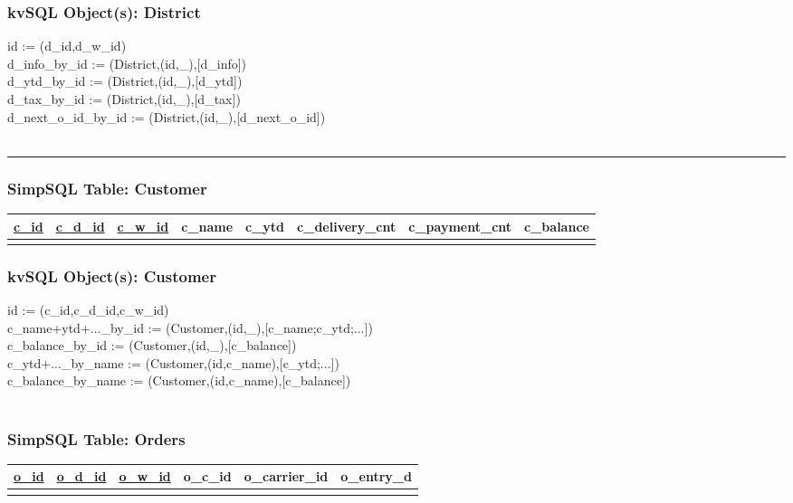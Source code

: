 \documentclass[12pt,letter]{article}
\begin{document}
\subsubsection*{kvSQL Object(s): District}  
 id := (d\_id,d\_w\_id) \\
 d\_info\_by\_id := 
(District,(id,\_),[d\_info])  \\
 d\_ytd\_by\_id := 
(District,(id,\_),[d\_ytd])  \\
 d\_tax\_by\_id := 
(District,(id,\_),[d\_tax])  \\
 d\_next\_o\_id\_by\_id := 
(District,(id,\_),[d\_next\_o\_id])  \\
\\ 
\hrule

\subsubsection*{SimpSQL Table: Customer}  
\begin{tabular}{ |c|c|c|c|c|c|c|c| }
 \hline
 \underline{c\_id} & \underline{c\_d\_id} & \underline{c\_w\_id} &
 c\_name & c\_ytd &
 c\_delivery\_cnt & c\_payment\_cnt & c\_balance\\
 \hline
 &   &   & & & & &\\
 \hline
\end{tabular}

\subsubsection*{kvSQL Object(s): Customer}  
id := (c\_id,c\_d\_id,c\_w\_id) \\
 c\_name+ytd+...\_by\_id := 
(Customer,(id,\_),[c\_name;c\_ytd;...])  \\
 c\_balance\_by\_id := 
(Customer,(id,\_),[c\_balance])  \\
 c\_ytd+...\_by\_name := 
(Customer,(id,c\_name),[c\_ytd;...])  \\
 c\_balance\_by\_name := 
(Customer,(id,c\_name),[c\_balance])  \\
\\

\subsubsection*{SimpSQL Table: Orders}  
\begin{tabular}{ |c|c|c|c|c|c| }
 \hline
 \underline{o\_id} & \underline{o\_d\_id} & \underline{o\_w\_id} &
 o\_c\_id & o\_carrier\_id & o\_entry\_d\\
 \hline
 &   &   & & &\\
 \hline
\end{tabular}
\end{document}
